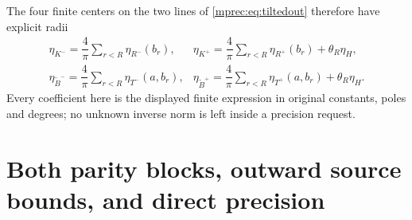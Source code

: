 \documentclass[11pt]{article}
\begin{document}
The four finite centers on the two lines of \eqref{mprec:eq:tiltedout}
therefore have explicit radii
\[
 \begin{array}{ll}
 \eta_{K^-}=\dfrac4\pi\sum_{r<R}\eta_{R^-}(b_r),&
 \eta_{K^+}=\dfrac4\pi\sum_{r<R}\eta_{R^+}(b_r)+\theta_R\eta_H,\\[3pt]
 \eta_{\widetilde B^-}=\dfrac4\pi\sum_{r<R}\eta_{T^-}(a,b_r),&
 \eta_{\widetilde B^+}=\dfrac4\pi\sum_{r<R}\eta_{T^+}(a,b_r)
                                      +\theta_R\eta_H.
 \end{array}
\]
Every coefficient here is the displayed finite expression in
original constants, poles and degrees; no unknown inverse norm
is left inside a precision request.

\section{Both parity blocks, outward source bounds, and direct precision}
\end{document}
